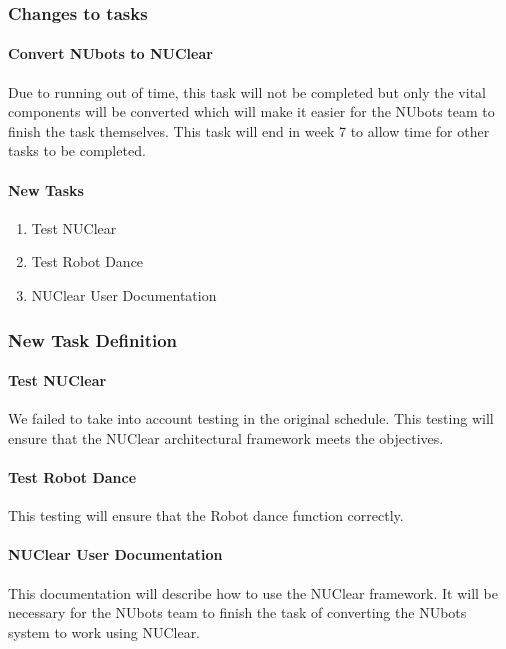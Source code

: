 \documentclass[english,12pt]{scrartcl}
\begin{document}
			\subsubsection{Changes to tasks}
				\paragraph{Convert NUbots to NUClear}
					Due to running out of time, this task will not be completed but only the vital components will be converted which will make it easier for the NUbots team to finish the task themselves. This task will end in week 7 to allow time for other tasks to be completed.
				\paragraph{New Tasks}
					\begin{enumerate}
						\item Test NUClear
						\item Test Robot Dance
						\item NUClear User Documentation
					\end{enumerate}
			\subsubsection{New Task Definition}
				\paragraph{Test NUClear}
					We failed to take into account testing in the original schedule. This testing will ensure that the NUClear architectural framework meets the objectives.
				\paragraph{Test Robot Dance}
					This testing will ensure that the Robot dance function correctly.
				\paragraph{NUClear User Documentation}
					This documentation will describe how to use the NUClear framework. It will be necessary for the NUbots team to finish the task of converting the NUbots system to work using NUClear.
					
\end{document}
